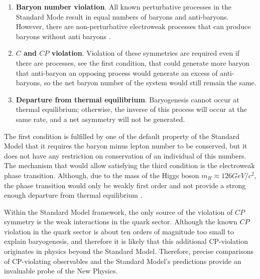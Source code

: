 \begin{enumerate}
    \item \textbf{Baryon number violation}.  All known perturbative processes in the Standard Mode result in equal numbers of baryons and anti-baryons. However, there are non-perturbative electroweak processes that can produce baryons without anti baryons \cite{bayron_number_violation}. 
    \item \textbf{$C$ and $CP$ violation}. Violation of these symmetries are required even if there are processes, see the first condition, that could generate more baryon that anti-baryon an opposing process would generate an excess of anti-baryons, so the net baryon number of the system would still remain the same.
    \item \textbf{Departure from thermal equilibrium}. Baryogenesis cannot occur at thermal equilibrium; otherwise, the inverse of this process will occur at the same rate, and a net asymmetry will not be generated.
\end{enumerate}

The first condition is fulfilled by one of the default property of the Standard Model that it requires the baryon minus lepton number to be conserved, but it does not have any restriction on conservation of an individual of this numbers.  The mechanism that would allow satisfying the third condition is the electroweak phase transition. Although, due to the mass of the Higgs boson $m_H \approx 126 GeV/c^{2}$, the phase transition would only be weakly first order and not provide a strong enough departure from thermal equilibrium \cite{phase_transiton}. 

 Within the Standard Model framework, the only source of the violation of $CP$ symmetry is the weak interactions in the quark sector. Although the known $CP$ violation in the quark sector is about ten orders of magnitude too small to explain baryogenesis, and therefore it is likely that this additional CP-violation originates in physics beyond the Standard Model. Therefore, precise comparisons of CP-violating observables and the Standard Model's predictions provide an invaluable probe of the New Physics.